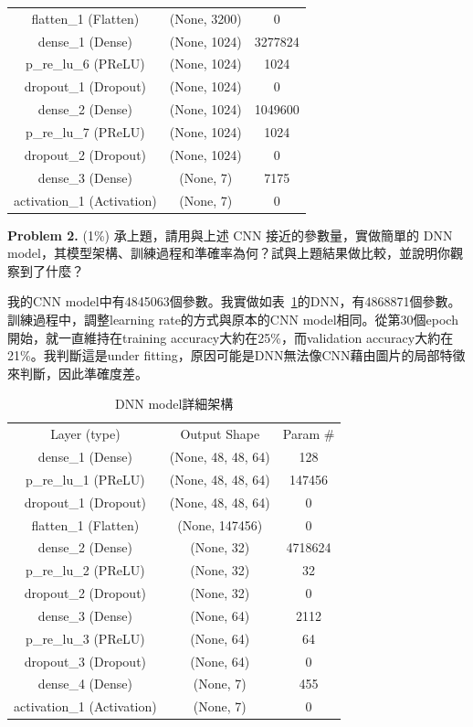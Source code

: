 \documentclass{article}
\begin{document}
\begin{table}
\begin{tabular}{c|c|c}
flatten\_1 (Flatten) & (None, 3200) & 0\\
dense\_1 (Dense) & (None, 1024) & 3277824\\
p\_re\_lu\_6 (PReLU) & (None, 1024) & 1024\\
dropout\_1 (Dropout) & (None, 1024) & 0\\
dense\_2 (Dense) & (None, 1024) & 1049600\\
p\_re\_lu\_7 (PReLU) & (None, 1024) & 1024\\
dropout\_2 (Dropout) & (None, 1024) & 0\\
dense\_3 (Dense) & (None, 7) &  7175\\
activation\_1 (Activation) & (None, 7) &  0\\
\end{tabular}
\end{table}

\textbf{Problem 2.} (1\%) 承上題，請用與上述 CNN 接近的參數量，實做簡單的 DNN model，其模型架構、訓練過程和準確率為何？試與上題結果做比較，並說明你觀察到了什麼？

我的CNN model中有4845063個參數。我實做如表~\ref{dnn_model}的DNN，有4868871個參數。訓練過程中，調整learning rate的方式與原本的CNN model相同。從第30個epoch開始，就一直維持在training accuracy大約在25\%，而validation accuracy大約在21\%。我判斷這是under fitting，原因可能是DNN無法像CNN藉由圖片的局部特徵來判斷，因此準確度差。

\begin{table}
\caption{DNN model詳細架構}
\label{dnn_model}
\begin{tabular}{c|c|c}
Layer (type)& Output Shape&Param \#\\
dense\_1 (Dense)&(None, 48, 48, 64)&128\\
p\_re\_lu\_1 (PReLU)&(None, 48, 48, 64)&147456\\
dropout\_1 (Dropout)&(None, 48, 48, 64)&0\\
flatten\_1 (Flatten)&(None, 147456)&0\\
dense\_2 (Dense)&(None, 32)&4718624\\
p\_re\_lu\_2 (PReLU)&(None, 32)&32\\
dropout\_2 (Dropout)&(None, 32)&0\\
dense\_3 (Dense)&(None, 64)&2112\\
p\_re\_lu\_3 (PReLU)&(None, 64)&64\\
dropout\_3 (Dropout)&(None, 64)&0\\
dense\_4 (Dense)&(None, 7)& 455\\
activation\_1 (Activation)&(None, 7)& 0\\
\end{tabular}
\end{table}
\end{document}

